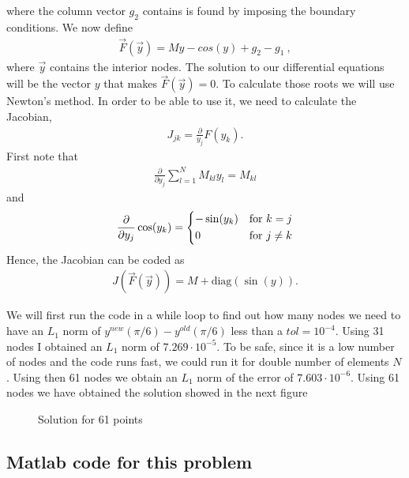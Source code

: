 where the column vector $g_2$ contains is found by imposing the boundary conditions. We now define
\begin{align*}
\vec{F}(\vec{y}) = My - cos(y) + g_2 - g_1~,
\end{align*}
where $\vec{y}$ contains the interior nodes. The solution to our differential equations will be the vector $y$ that makes $\vec{F}(\vec{y})=0$. To calculate those roots we will use Newton's method. In order to be able to use it, we need to calculate the Jacobian,
\begin{align*}
J_{jk}=\frac{\partial}{y_j}F(y_k).
\end{align*}
First note that
\begin{align*}
\frac{\partial }{\partial y_j} \sum_{l=1}^{N}M_{kl}y_l = M_{kl}
\end{align*}
and
\begin{align*}
\frac{\partial }{\partial y_j} \cos(y_k) = \begin{dcases}
	-\sin(y_k) & \text{for}~k = j\\
		0 & \text{for}~j \neq k 
\end{dcases}
\end{align*}
Hence, the Jacobian can be coded as
\begin{align*}
J(\vec{F}(\vec{y})) = M + \text{diag}(\sin(y)).
\end{align*}

We will first run the code in a while loop to find out how many nodes we need to have an $L_1$ norm of $y^{new}(\pi/6)-y^{old}(\pi/6)$ less than a $tol=10^{-4}$. Using 31 nodes I obtained an $L_1$ norm of $7.269\cdot 10^{-5}$. To be safe, since it is a low number of nodes and the code runs fast, we could run it for double number of elements $N$. Using then 61 nodes we obtain an $L_1$ norm of the error of $7.603\cdot 10^{-6}$. Using 61 nodes we have obtained the solution showed in the next figure

\begin{figure}[H]
\caption{Solution for 61 points}
\end{figure}

\subsection*{Matlab code for this problem}

